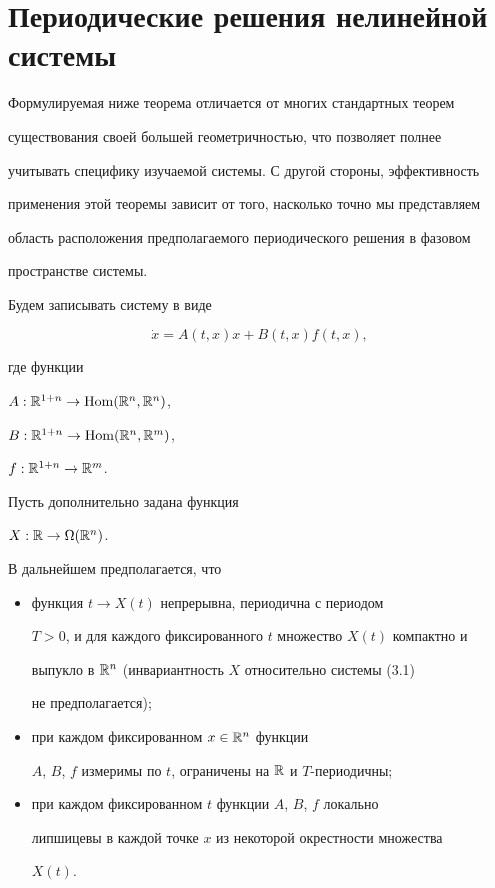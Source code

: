 \section{Периодические решения нелинейной системы}





Формулируемая ниже теорема отличается от многих стандартных теорем


существования своей большей геометричностью, что позволяет полнее


учитывать специфику изучаемой системы. С другой стороны, эффективность


применения этой теоремы зависит от того, насколько точно мы представляем


область расположения предполагаемого периодического решения в фазовом


пространстве системы.





Будем записывать систему в виде


%


\begin{equation}


\Dot x = A(t,x)x + B(t,x)f(t,x),


\end{equation}


%


где функции


$A:\Bbb R^{1+n}\to \operatorname{Hom}(\Bbb R^{n},\Bbb R^{n})$,


$B:\Bbb R^{1+n}\to \operatorname{Hom}(\Bbb R^{n},\Bbb R^{m})$,


$f:\Bbb R^{1+n}\to \Bbb R^{m}$.


Пусть дополнительно задана функция


$X: \Bbb R \to \Omega(\Bbb R^{n})$.


В дальнейшем предполагается, что


\begin{itemize}


\item[а)] функция $t \to X(t)$ непрерывна, периодична с периодом


$T>0$, и для каждого фиксированного $t$ множество $X(t)$ компактно и


выпукло в $\Bbb R^{n}$ (инвариантность $X$ относительно системы (3.1)


не предполагается);


\item[б)] при каждом фиксированном $x\in \Bbb R^{n}$ функции


$A$, $B$, $f$ измеримы по $t$, ограничены на $\Bbb R$ и $T$-периодичны;


\item[в)] при каждом фиксированном $t$ функции $A$, $B$, $f$ локально


липшицевы в каждой точке $x$ из некоторой окрестности множества


$X(t)$.


\end{itemize}






